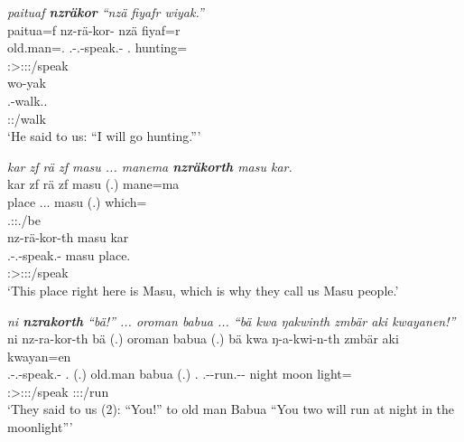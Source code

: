 \begin{exe}
	\ex \emph{paituaf \textbf{nzräkor} ``nzä fiyafr wiyak.''}\\
	\glll paitua=f nz-rä-kor-\Zero{} nzä fiyaf=r\\
	old.man=\Erg.\Sg{} \Fnsg.\Bet-\Irr.\Ndu-speak.\Rs-\Stsg{} \Fsg.\Abs{} hunting=\Purp{}\\
	{} \footnotesize{\Stsg:\Sbj>\Fpl:\Obj:\Irr:\Pfv/speak} {} {}\\
	\sn
	\glll wo-yak\\
	\Fsg.\Alph-walk.\Ext.\Ndu\\
	\footnotesize{\Fsg:\Nonpast:\Ipfv/walk}\\
	\trans `He said to us: ``I will go hunting.'''
	\label{ex249}
\end{exe}
\begin{exe}
	\ex \emph{kar zf rä zf masu ... manema \textbf{nzräkorth} masu kar.}\\
	\glll kar zf rä zf masu (.) mane=ma\\
	place \Imm{} \Tsg.\F.\Cop.\Ndu{} \Imm{} masu (.) which=\Char{}\\
	{} {} \footnotesize{\Tsg.\F:\Sbj:\Nonpast.\Ipfv/be} {} {} {} {}\\
	\sn
	\glll
	nz-rä-kor-th masu kar\\
	\Fnsg.\Bet-\Irr.\Ndu-speak.\Rs-\Stnsg{} masu place.\\
	\footnotesize{\Stpl:\Sbj>\Fpl:\Obj:\Irr:\Pfv/speak} {} {}\\
	\trans `This place right here is Masu, which is why they call us Masu people.'\\
	\label{ex250}
\end{exe}
\begin{exe}
	\ex \emph{ni \textbf{nzrakorth} ``bä!'' ... oroman babua ... ``bä kwa ŋakwinth zmbär aki kwayanen!''}\\
	\glll ni nz-ra-kor-th bä (.) oroman babua (.) bä kwa ŋ-a-kwi-n-th zmbär aki kwayan=en\\
	\Fnsg{} \Fnsg.\Bet-\Irr.\Du-speak.\Rs-\Stnsg{} \Second.\Abs{} (.) old.man babua (.) \Second.\Abs{} \Fut{} \M.\Alph-\Vc-run.\Ext-\Du-\Stnsg{} night moon light=\Loc\\
	{} \footnotesize{\Stpl:\Sbj>\Fdu:\Obj:\Irr:\Pfv/speak} {} {} {} {} {} {} {} \footnotesize{\Stdu:\Sbj:\Nonpast:\Ipfv/run} {} {} {}\\
	\trans `They said to us (2): ``You!'' to old man Babua ``You two will run at night in the moonlight'''
	\label{ex247}
\end{exe}

